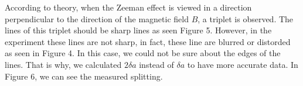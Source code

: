 \documentclass[a4paper,12pt]{article}
\begin{document}
\begin{figure}[!h]
	\begin{floatrow}
	
	\end{floatrow}
\end{figure}
According to theory, when the Zeeman effect is viewed in a direction perpendicular to the direction of the magnetic field $B$, a triplet is observed. The lines of this triplet should be sharp lines as seen Figure 5. However, in the experiment these lines are not sharp, in fact, these line are blurred or distorded as seen in Figure 4. In this case, we could not be sure about the edges of the lines. That is why, we calculated $2\delta a$ instead of $\delta a$ to have more accurate data. In Figure 6, we can see the measured splitting.\\\\
\end{document}
